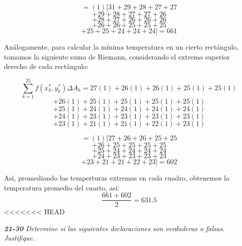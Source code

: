 \documentclass[a4paper,12pt]{article}
\begin{document}
\begin{itemize}
		$$ = (1) [31 + 29 + 28 + 27 + 27  $$
   		$$ + 29 + 28 + 27 + 27 + 26 $$
   		$$ + 28 + 27 + 26 + 26 + 26 $$
   		$$ + 26 + 26 + 25 + 25 + 25 $$
   		$$ + 25 + 25 + 24 + 24 + 24]  = 661$$

	Análogamente, para calcular la mínima temperatura en un cierto rectángulo,
	tomamos la siguiente suma de Riemann, considerando el extremo superior
	derecho de cada rectángulo:

	$$ \sum_{k=1}^{25} f(x^{*}_{k}, y^{*}_{k}) \Delta A_{k} =
		 27(1) + 26(1) + 26(1) + 25(1) + 25(1)  $$
	$$ + 26(1) + 25(1) + 25(1) + 25(1) + 25(1) $$
	$$ + 25(1) + 24(1) + 24(1) + 24(1) + 24(1) $$
	$$ + 24(1) + 23(1) + 23(1) + 23(1) + 23(1) $$
	$$ + 23(1) + 21(1) + 21(1) + 22(1) + 23(1) $$

	$$ = (1) [27 + 26 + 26 + 25 + 25  $$
	$$ + 26 + 25 + 25 + 25 + 25 $$
	$$ + 25 + 24 + 24 + 24 + 24 $$
	$$ + 24 + 23 + 23 + 23 + 23 $$
	$$ + 23 + 21 + 21 + 22 + 23] = 602 $$

	Así, promediando las temperturas extremas en cada cuadro, obtenemos la temperatura
	promedio del cuarto, así:
		$$ \frac{661 + 602}{2} = 631.5$$
<<<<<<< HEAD
\end{itemize}
\textit{\textbf{21-30} Determine si las siguientes declaraciones son verdaderas o falsas. Justifique.}
\end{document}
